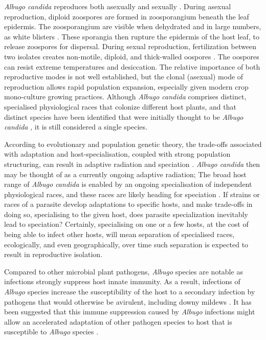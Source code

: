 \textit{Albugo candida} reproduces both asexually and sexually \parencite{Holub1995}⁠. During asexual reproduction, diploid zoospores are formed in zoosporangium beneath the leaf epidermis. The zoosporangium are visible when dehydrated and in large numbers, as white blisters \parencite{Holub1995}. These sporangia then rupture the epidermis of the host leaf, to release zoospores for dispersal. During sexual reproduction, fertilization between two isolates creates non-motile, diploid, and thick-walled oospores \parencite{Holub1995}⁠. The oospores can resist extreme temperatures and desiccation. The relative importance of both reproductive modes is not well established, but the clonal (asexual) mode of reproduction allows rapid population expansion, especially given modern crop mono-culture growing practices. Although \textit{Albugo candida} comprises distinct, specialised physiological races that colonize different host plants, and that distinct species have been identified that were initially thought to be \textit{Albugo candida} \parencite{Choi2011}, it is still considered a single species.

According to evolutionary and population genetic theory, the trade-offs associated with adaptation and host-specialisation, coupled with strong population structuring, can result in adaptive radiation and speciation \parencite{Abbott2013,Stukenbrock2013EvolutionPathogens}. \textit{Albugo candida} then may be thought of as a currently ongoing adaptive radiation; The broad host range of \textit{Albugo candida} is enabled by an ongoing specialisation of independent physiological races, and these races are likely heading for speciation \parencite{Dres2002a}. If strains or races of a parasite develop adaptations to specific hosts, and make trade-offs in doing so, specialising to the given host, does parasite specialization inevitably lead to speciation? Certainly, specialising on one or a few hosts, at the cost of being able to infect other hosts, will mean separation of specialised races, ecologically, and even geographically, over time such separation is expected to result in  reproductive isolation.

Compared to other microbial plant pathogens, \textit{Albugo} species are notable as infections strongly suppress host innate immunity. As a result, infections of \textit{Albugo} species increase the susceptibility of the host to a secondary infection by pathogens that would otherwise be avirulent, including downy mildews \parencite{Cooper2008}. It has been suggested that this immune suppression caused by \textit{Albugo} infections might allow an accelerated adaptation of other pathogen species to host that is susceptible to \textit{Albugo} species \parencite{Thines2014}⁠.

